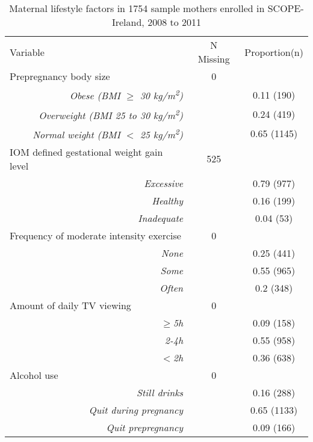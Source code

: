 \documentclass[10pt]{article}
\begin{document}
\begin{table}
\begin{threeparttable}
\captionsetup{width=.5\textwidth}
\caption {Maternal lifestyle factors in 1754 sample mothers enrolled in SCOPE-Ireland, 2008 to 2011}
\centering
\begin{tabular}{lcc} 

\toprule

Variable & N Missing & Proportion(n) \\
\cmidrule(lr){2-3}
\addlinespace[6pt]                                     

Prepregnancy body size & 0 &    \\
\multicolumn{1}{r}{\textit{Obese (BMI $\geq$ 30 kg/m\textsuperscript{2})}} &   & 0.11 (190)  \\
\multicolumn{1}{r}{\textit{Overweight (BMI 25 to 30 kg/m\textsuperscript{2})}} &   & 0.24 (419)  \\
\multicolumn{1}{r}{\textit{Normal weight (BMI $<$ 25 kg/m\textsuperscript{2})}} &   & 0.65 (1145)  \\
IOM defined gestational weight gain level & 525 &    \\
\multicolumn{1}{r}{\textit{Excessive}} &   & 0.79 (977)  \\
\multicolumn{1}{r}{\textit{Healthy}} &   & 0.16 (199)  \\
\multicolumn{1}{r}{\textit{Inadequate}} &   & 0.04 (53)  \\
Frequency of moderate intensity exercise & 0 &    \\
\multicolumn{1}{r}{\textit{None}} &   & 0.25 (441)  \\
\multicolumn{1}{r}{\textit{Some}} &   & 0.55 (965)  \\
\multicolumn{1}{r}{\textit{Often}} &   & 0.2 (348)  \\
Amount of daily TV viewing & 0 &   \\
\multicolumn{1}{r}{\textit{$\geq$5h}} &   & 0.09 (158)  \\
\multicolumn{1}{r}{\textit{2-4h}} &   & 0.55 (958)  \\
\multicolumn{1}{r}{\textit{$<$2h}} &   & 0.36 (638)  \\
Alcohol use & 0 &    \\
\multicolumn{1}{r}{\textit{Still drinks}} &   & 0.16 (288)  \\
\multicolumn{1}{r}{\textit{Quit during pregnancy}} &   & 0.65 (1133)  \\
\multicolumn{1}{r}{\textit{Quit prepregnancy}} &   & 0.09 (166)  \\

\end{tabular}
\end{threeparttable}
\end{table}
\end{document}
